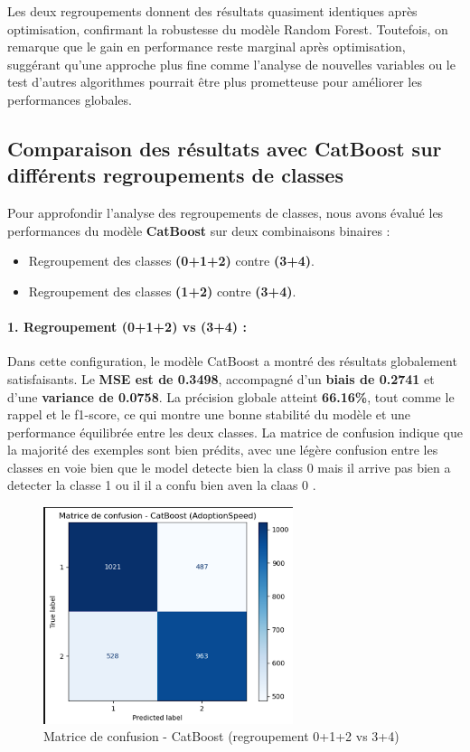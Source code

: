 \documentclass[a4paper,12pt]{article}
\begin{document}
Les deux regroupements donnent des résultats quasiment identiques après optimisation, confirmant la robustesse du modèle Random Forest. Toutefois, on remarque que le gain en performance reste marginal après optimisation, suggérant qu’une approche plus fine comme l’analyse de nouvelles variables ou le test d’autres algorithmes pourrait être plus prometteuse pour améliorer les performances globales.

\subsection{Comparaison des résultats avec CatBoost sur différents regroupements de classes}

Pour approfondir l’analyse des regroupements de classes, nous avons évalué les performances du modèle \textbf{CatBoost} sur deux combinaisons binaires : 
\begin{itemize}
    \item Regroupement des classes \textbf{(0+1+2)} contre \textbf{(3+4)}.
    \item Regroupement des classes \textbf{(1+2)} contre \textbf{(3+4)}.
\end{itemize}

\paragraph{1. Regroupement (0+1+2) vs (3+4) :}

Dans cette configuration, le modèle CatBoost a montré des résultats globalement satisfaisants.
 Le \textbf{MSE est de 0.3498}, accompagné d’un \textbf{biais de 0.2741} et d’une \textbf{variance de 0.0758}.
  La précision globale atteint \textbf{66.16\%}, tout comme le rappel et le f1-score, ce qui montre une bonne
   stabilité du modèle et une performance équilibrée entre les deux classes. La matrice de 
   confusion indique que la majorité des exemples sont bien prédits, avec une légère confusion entre les classes en voie 
   bien que le model detecte bien la class 0 mais il arrive pas bien a detecter la classe 1 ou il il a confu bien aven la claas 0 .

\begin{figure}[H]
    \centering
    \includegraphics[width=0.65\textwidth]{catboost_012_vs_34_confusion.png}
    \caption{Matrice de confusion - CatBoost (regroupement 0+1+2 vs 3+4)}
    \label{fig:catboost012_conf}
\end{figure}
\end{document}
